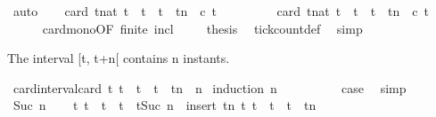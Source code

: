 \begin{isabellebody}
\ auto\isanewline
\ \ \isamarkupfalse%
\ {\isacartoucheopen}card\ {\isacharbraceleft}t{\isacharcolon}{\isacharcolon}nat{\isachardot}\ t\ {\isasymle}\ t\ {\isasymand}\ t\ {\isacharless}\ tn\ {\isasymand}\ c\ t{\isacharbraceright}\isanewline
\ \ \ \ \ \ \ \ {\isasymle}\ card\ {\isacharbraceleft}t{\isacharcolon}{\isacharcolon}nat{\isachardot}\ t\ {\isasymle}\ t\ {\isasymand}\ t\ {\isacharless}\ tn{\isacharprime}\ {\isasymand}\ c\ t{\isacharbraceright}{\isacartoucheclose}\isanewline
\ \ \ \ \isamarkupfalse%
\ card{\isacharunderscore}mono{\isacharbrackleft}OF\ finite\ incl{\isacharbrackright}\ \isacommand{{\isachardot}}\isamarkupfalse%
\isanewline
\ \ \isamarkupfalse%
\ {\isacharquery}thesis\ \isamarkupfalse%
\ tick{\isacharunderscore}count{\isacharunderscore}def\ \isamarkupfalse%
\ simp\isanewline
{}\isamarkupfalse%
%
\endisatagproof
{\isafoldproof}%
%
\isadelimproof
%
\endisadelimproof
%
\begin{isamarkuptext}%
The interval [t, t+n[ contains n instants.%
\end{isamarkuptext}\isamarkuptrue%
\isamarkupfalse%
\ card{\isacharunderscore}interval{\isacharcolon}{\isacartoucheopen}card\ {\isacharbraceleft}t{\isachardot}\ t\ {\isasymle}\ t\ {\isasymand}\ t\ {\isacharless}\ tn{\isacharbraceright}\ {\isacharequal}\ n{\isacartoucheclose}\isanewline
%
\isadelimproof
%
\endisadelimproof
%
\isatagproof
{}\isamarkupfalse%
\ {\isacharparenleft}induction\ n{\isacharparenright}\isanewline
\ \ \isamarkupfalse%
\ {}\isanewline
\ \ \isamarkupfalse%
\ \isamarkupfalse%
\ {\isacharquery}case\ \isamarkupfalse%
\ simp\isanewline
{}\isamarkupfalse%
\isanewline
\ \ \isamarkupfalse%
\ {\isacharparenleft}Suc\ n{\isacharparenright}\isanewline
\ \ \isamarkupfalse%
\ {\isacartoucheopen}{\isacharbraceleft}t{\isachardot}\ t\ {\isasymle}\ t\ {\isasymand}\ t\ {\isacharless}\ tSuc\ n{\isacharparenright}{\isacharbraceright}\ {\isacharequal}\ insert\ {\isacharparenleft}tn{\isacharparenright}\ {\isacharbraceleft}t{\isachardot}\ t\ {\isasymle}\ t\ {\isasymand}\ t\ {\isacharless}\ tn{\isacharbraceright}{\isacartoucheclose}\ \isamarkupfalse%

\end{isabellebody}
